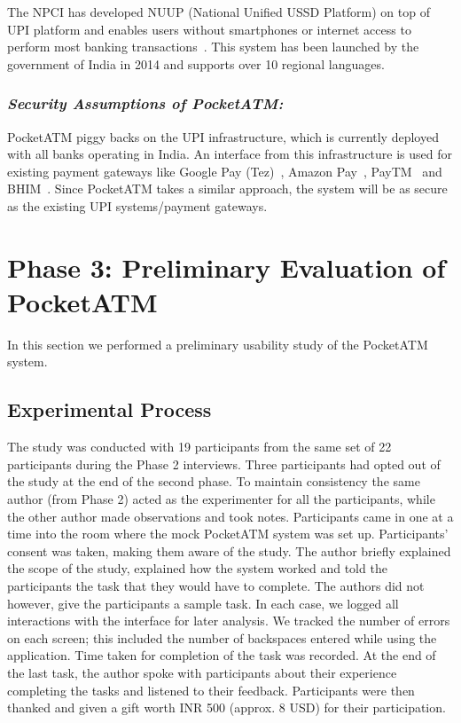 The NPCI has developed NUUP (National Unified USSD Platform) on top of UPI platform and enables users without smartphones or internet access to perform most banking transactions~\cite{NPCINUUP}. This system has been launched by the government of India in 2014 and supports over 10 regional languages.

\subsubsection*{\textbf{\textit{Security Assumptions of PocketATM:}}}
\label{sssec:securityassumptions}

PocketATM piggy backs on the UPI infrastructure, which is currently deployed with all banks operating in India. An interface from this infrastructure is used for existing payment gateways like Google Pay (Tez)~\cite{GoogleTez}, Amazon Pay~\cite{AmazonPay}, PayTM~\cite{PayTM} and BHIM~\cite{BHIM}. Since PocketATM takes a similar approach, the system will be as secure as the existing UPI systems/payment gateways.

\section{Phase 3: Preliminary Evaluation of PocketATM}
\label{sec:phase3evaluation}

In this section we performed a preliminary usability study of the PocketATM system.

\subsection{Experimental Process}
\label{ssec:experimentalprocess}

The study was conducted with 19 participants from the same set of 22 participants during the Phase 2 interviews. Three participants had opted out of the study at the end of the second phase. To maintain consistency the same author (from Phase 2) acted as the experimenter for all the participants, while the other author made observations and took notes. Participants came in one at a time into the room where the mock PocketATM system was set up. Participants' consent was taken, making them aware of the study. The author briefly explained the scope of the study, explained how the system worked and told the participants the task that they would have to complete. The authors did not however, give the participants a sample task. In each case, we logged all interactions with the interface for later analysis. We tracked the number of errors on each screen; this included the number of backspaces entered while using the application.  Time taken for completion of the task was recorded. At the end of the last task, the author spoke with participants about their experience completing the tasks and listened to their feedback. Participants were then thanked and given a gift worth INR 500 (approx. 8 USD) for their participation.

